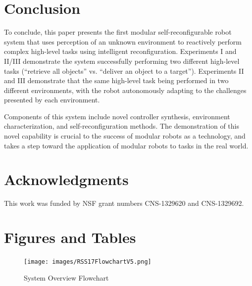\documentclass[12pt]{article}
\begin{document}
\section{Conclusion}
%
To conclude, this paper presents the first modular self-reconfigurable robot system that uses perception of an unknown environment to reactively perform complex high-level tasks using intelligent reconfiguration. Experiments I and II/III demonstrate
the system successfully performing two different high-level tasks (``retrieve
all objects'' vs. ``deliver an object to a target''). Experiments II and
III demonstrate that the same high-level task being performed in two different
environments, with the robot autonomously adapting to the challenges presented
by each environment.

Components of this system include novel controller synthesis, environment characterization, and self-reconfiguration methods. The demonstration of this novel capability is crucial to the success of modular robots as a technology, and takes a step toward the application of modular robots to tasks in the real world.
%
\section*{Acknowledgments}
%
This work was funded by NSF grant numbers CNS-1329620 and CNS-1329692.





%

\section*{Figures and Tables}


\begin{figure}
\begin{center}
\texttt{[image: images/RSS17FlowchartV5.png]}
\caption{System Overview Flowchart}
\label{fig:overview}
\end{center}
\end{figure}
\end{document}
